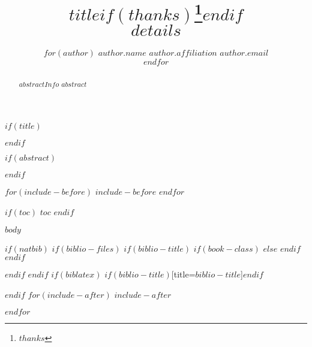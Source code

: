 \documentclass[12pt,usenames,dvipsnames,article,oneside,$if(fontsize)$$fontsize$,$endif$$if(lang)$$lang$,$endif$]{$documentclass$}
\title{\vspace{-6.66em}\Huge $title$$if(thanks)$\thanks{$thanks$}$endif$ \\ \bigskip \normalsize $details$\vspace{-6em}}
\author{$for(author)$ \href{$author.website$}{$author.name$}\newline
\emph{$author.affiliation$}\newline
{\ttfamily \href{mailto:$author.email$}{$author.email$}}\\ \bigskip
$endfor$}
\date{}
\begin{document}
  \def\ind{\hangindent=1 true cm\hangafter=1 \noindent}
  \def\labelitemi{~}
  \renewcommand{\labelitemii}{~}

$if(title)$
\maketitle
$endif$

$if(abstract)$
\renewcommand{\abstractname}{}
\begin{abstract}
\noindent \textbf{$abstractInfo$} $abstract$
\end{abstract}
$endif$

$for(include-before)$
$include-before$
$endfor$

$if(toc)$
{
\hypersetup{linkcolor=black}
$toc$ \pagebreak
}
$endif$

$body$

$if(natbib)$
$if(biblio-files)$
$if(biblio-title)$
$if(book-class)$
\renewcommand\bibname{$biblio-title$}
$else$
\renewcommand\refname{$biblio-title$}
$endif$
$endif$


$endif$
$endif$
$if(biblatex)$
\printbibliography$if(biblio-title)$[title=$biblio-title$]$endif$

$endif$
$for(include-after)$
$include-after$

$endfor$
\end{document}
